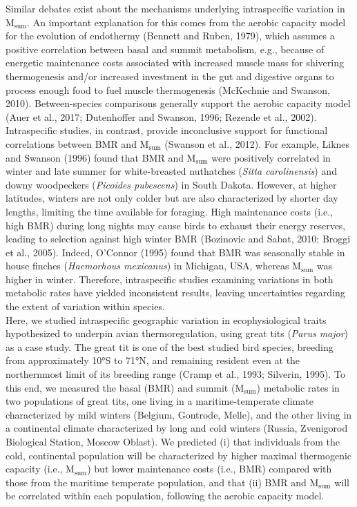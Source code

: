\documentclass[10pt, twoside]{book} %
\begin{document}
Similar debates exist about the mechanisms underlying intraspecific variation in M$_{\text{sum}}$. An important explanation for this comes from the aerobic capacity model for the evolution of endothermy (Bennett and Ruben, 1979), which assumes a positive correlation between basal and summit metabolism, e.g., because of energetic maintenance costs associated with increased muscle mass for shivering thermogenesis and/or increased investment in the gut and digestive organs to process enough food to fuel muscle thermogenesis (McKechnie and Swanson, 2010). Between-species comparisons generally support the aerobic capacity model (Auer et al., 2017; Dutenhoffer and Swanson, 1996; Rezende et al., 2002). Intraspecific studies, in contrast, provide inconclusive support for functional correlations between BMR and M$_{\text{sum}}$ (Swanson et al., 2012). For example, Liknes and Swanson (1996) found that BMR and M$_{\text{sum}}$ were positively correlated in winter and late summer for white-breasted nuthatches (\textit{Sitta carolinensis}) and downy woodpeckers (\textit{Picoides pubescens}) in South Dakota. However, at higher latitudes, winters are not only colder but are also characterized by shorter day lengths, limiting the time available for foraging. High maintenance costs (i.e., high BMR) during long nights may cause birds to exhaust their energy reserves, leading to selection against high winter BMR (Bozinovic and Sabat, 2010; Broggi et al., 2005). Indeed, O’Connor (1995) found that BMR was seasonally stable in house finches (\textit{Haemorhous mexicanus}) in Michigan, USA, whereas M$_{\text{sum}}$ was higher in winter. Therefore, intraspecific studies examining variations in both metabolic rates have yielded inconsistent results, leaving uncertainties regarding the extent of variation within species. \\

Here, we studied intraspecific geographic variation in ecophysiological traits hypothesized to underpin avian thermoregulation, using great tits (\textit{Parus major}) as a case study. The great tit is one of the best studied bird species, breeding from approximately 10°S to 71°N, and remaining resident even at the northernmost limit of its breeding range (Cramp et al., 1993; Silverin, 1995). To this end, we measured the basal (BMR) and summit (M$_{\text{sum}}$) metabolic rates in two populations of great tits, one living in a maritime-temperate climate characterized by mild winters (Belgium, Gontrode, Melle), and the other living in a continental climate characterized by long and cold winters (Russia, Zvenigorod Biological Station, Moscow Oblast). We predicted (i) that individuals from the cold, continental population will be characterized by higher maximal thermogenic capacity (i.e., M$_{\text{sum}}$) but lower maintenance costs (i.e., BMR) compared with those from the maritime temperate population, and that (ii) BMR and M$_{\text{sum}}$ will be correlated within each population, following the aerobic capacity model. \\
\end{document}
